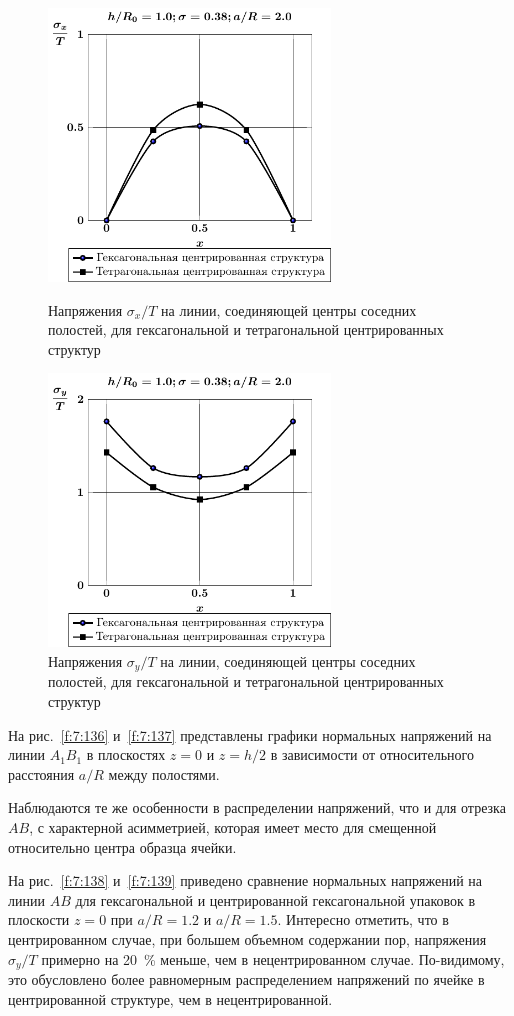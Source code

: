 \begin{figure}[h!]
\centering\footnotesize
\parbox[b]{7.5cm}{\centering\includegraphics[width=7.5cm]{cav7-5-sig_x.pdf}
\caption{Напряжения $\sigma_x/T$ на линии, соединяющей центры соседних полостей, для гексагональной и тетрагональной центрированных структур
\label{f:7:25}}}\hfil\hfil
\parbox[b]{7.5cm}{\centering\includegraphics[width=7.5cm]{cav7-5-sig_y.pdf}
\caption{Напряжения $\sigma_y/T$ на линии, соединяющей центры соседних полостей, для гексагональной и тетрагональной центрированных структур
\label{f:7:26}}}
\end{figure}

На рис.~\ref{f:7:136} и~\ref{f:7:137} представлены графики нормальных напряжений на линии $A_1B_1$ в плоскостях $z=0$ и $z=h/2$ в зависимости от относительного расстояния $a/R$ между полостями.

Наблюдаются те же особенности в распределении напряжений, что и для отрезка $AB$, с характерной асимметрией, которая имеет место для смещенной относительно центра образца ячейки.

На рис.~\ref{f:7:138} и~\ref{f:7:139} приведено сравнение нормальных напряжений на линии $AB$ для гексагональной и центрированной гексагональной упаковок в плоскости $z=0$ при $a/R=1.2$ и $a/R=1.5$. Интересно отметить, что в центрированном случае, при большем объемном содержании пор, напряжения $\sigma_y/T$ примерно на 20~\% меньше, чем в нецентрированном случае. По-видимому, это обусловлено более равномерным распределением напряжений по ячейке в центрированной структуре, чем в нецентрированной.

